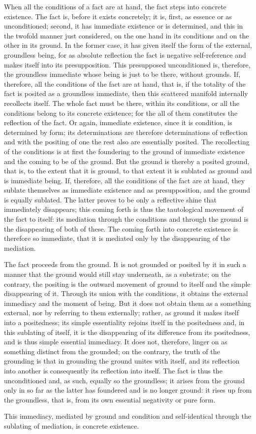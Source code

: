 When all the conditions of a fact are at hand,
the fact steps into concrete existence.
The fact is, before it exists concretely;
it is, first, as essence or as unconditioned;
second, it has immediate existence or is determined,
and this in the twofold manner just considered,
on the one hand in its conditions
and on the other in its ground.
In the former case, it has given itself the form
of the external, groundless being,
for as absolute reflection the fact is
negative self-reference and makes itself into its presupposition.
This presupposed unconditioned is, therefore, the groundless immediate
whose being is just to be there, without grounds.
If, therefore, all the conditions of the fact are at hand,
that is, if the totality of the fact is posited as a groundless immediate,
then this scattered manifold internally recollects itself.
The whole fact must be there, within its conditions,
or all the conditions belong to its concrete existence;
for the all of them constitutes the reflection of the fact.
Or again, immediate existence, since it is condition, is determined by form;
its determinations are therefore determinations of reflection
and with the positing of one the rest also are essentially posited.
The recollecting of the conditions is at first
the foundering to the ground of immediate existence
and the coming to be of the ground.
But the ground is thereby a posited ground, that is,
to the extent that it is ground,
to that extent it is sublated as ground
and is immediate being.
If, therefore, all the conditions of the fact are at hand,
they sublate themselves as immediate existence and as presupposition,
and the ground is equally sublated.
The latter proves to be only a reflective shine
that immediately disappears;
this coming forth is thus the tautological movement
of the fact to itself:
its mediation through the conditions and through the ground
is the disappearing of both of these.
The coming forth into concrete existence is therefore so immediate,
that it is mediated only by the disappearing of the mediation.

The fact proceeds from the ground.
It is not grounded or posited by it
in such a manner that the ground
would still stay underneath, as a substrate;
on the contrary, the positing is
the outward movement of ground to itself
and the simple disappearing of it.
Through its union with the conditions,
it obtains the external immediacy and the moment of being.
But it does not obtain them as a something external,
nor by referring to them externally;
rather, as ground it makes itself into a positedness;
its simple essentiality rejoins itself in the positedness
and, in this sublating of itself,
it is the disappearing of its difference from its positedness,
and is thus simple essential immediacy.
It does not, therefore, linger on
as something distinct from the grounded;
on the contrary, the truth of the grounding is
that in grounding the ground unites with itself,
and its reflection into another is
consequently its reflection into itself.
The fact is thus the unconditioned
and, as such, equally so the groundless;
it arises from the ground only in so far as
the latter has foundered and is no longer ground:
it rises up from the groundless, that is,
from its own essential negativity or pure form.

This immediacy, mediated by ground and condition
and self-identical through the sublating of mediation,
is concrete existence.
